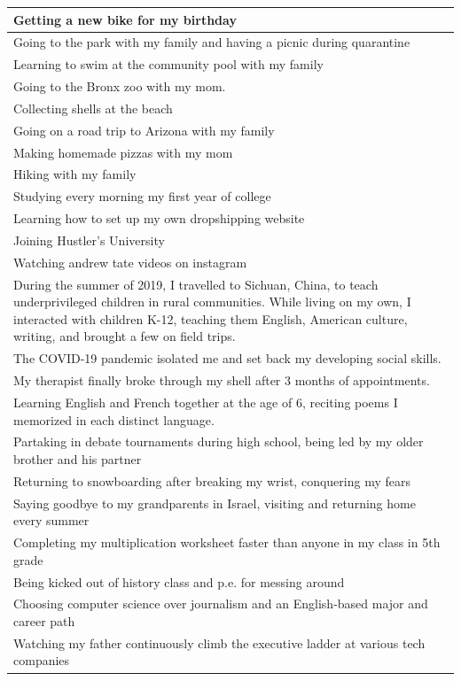 \documentclass[
  .7em,
  letterpaper,
  DIV=11,
  numbers=noendperiod]{scrartcl}
\begin{document}
\begin{table}
\begin{tabular}{l}
\hline
Getting a new bike for my birthday\\
\hline
Going to the park with my family and having a picnic during quarantine\\
\hline
Learning to swim at the community pool with my family\\
\hline
Going to the Bronx zoo with my mom.\\
\hline
Collecting shells at the beach\\
\hline
Going on a road trip to Arizona with my family\\
\hline
Making homemade pizzas with my mom\\
\hline
Hiking with my family\\
\hline
Studying every morning my first year of college\\
\hline
Learning how to set up my own dropshipping website\\
\hline
Joining Hustler's University\\
\hline
Watching andrew tate videos on instagram\\
\hline
During the summer of 2019, I travelled to Sichuan, China, to teach underprivileged children in rural communities. While living on my own, I interacted with children K-12, teaching them English, American culture, writing, and brought a few on field trips.\\
\hline
The COVID-19 pandemic isolated me and set back my developing social skills.\\
\hline
My therapist finally broke through my shell after 3 months of appointments.\\
\hline
Learning English and French together at the age of 6, reciting poems I memorized in each distinct language.\\
\hline
Partaking in debate tournaments during high school, being led by my older brother and his partner\\
\hline
Returning to snowboarding after breaking my wrist, conquering my fears\\
\hline
Saying goodbye to my grandparents in Israel, visiting and returning home every summer\\
\hline
Completing my multiplication worksheet faster than anyone in my class in 5th grade\\
\hline
Being kicked out of history class and p.e. for messing around\\
\hline
Choosing computer science over journalism and an English-based major and career path\\
\hline
Watching my father continuously climb the executive ladder at various tech companies\\

\end{tabular}
\end{table}
\end{document}
